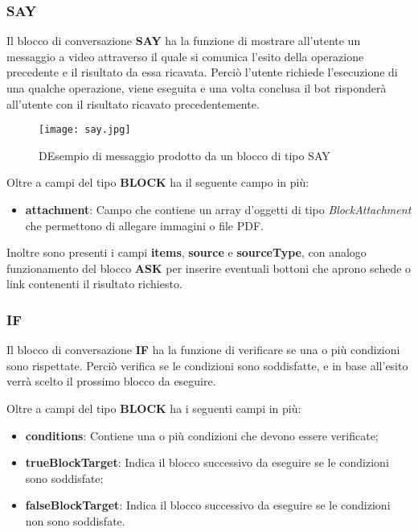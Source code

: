 \subsubsection{SAY}

Il blocco di conversazione \textbf{SAY} ha la funzione di mostrare all'utente un messaggio a video attraverso il quale si comunica l'esito della operazione precedente e il risultato da essa ricavata. Perciò l'utente richiede l'esecuzione di una qualche operazione, viene eseguita e una volta conclusa il bot risponderà all'utente con il risultato ricavato precedentemente.

\begin{figure}[htbp]
	\centering
	\texttt{[image: say.jpg]}
	\caption{DEsempio di messaggio prodotto da un blocco di tipo SAY}
\end{figure}
Oltre a campi del tipo \textbf{BLOCK} ha il seguente campo in più:

\begin{itemize}
	\item \textbf{attachment}: Campo che contiene un array d'oggetti di tipo \textsl{BlockAttachment} che permettono di allegare immagini o file PDF.
\end{itemize}

Inoltre sono presenti i campi \textbf{items}, \textbf{source} e \textbf{sourceType}, con analogo funzionamento del blocco \textbf{ASK} per inserire eventuali bottoni che aprono schede o link contenenti il risultato richiesto.

\subsubsection{IF}

Il blocco di conversazione \textbf{IF} ha la funzione di verificare se una o più condizioni sono rispettate. Perciò verifica se le condizioni sono soddisfatte, e in base all'esito verrà scelto il prossimo blocco da eseguire.

Oltre a campi del tipo \textbf{BLOCK} ha i seguenti campi in più:

\begin{itemize}
	\item \textbf{conditions}: Contiene una o più condizioni che devono essere verificate;
	\item \textbf{trueBlockTarget}: Indica il blocco successivo da eseguire se le condizioni sono soddisfate;
	\item \textbf{falseBlockTarget}: Indica il blocco successivo da eseguire se le condizioni non sono soddisfate.
\end{itemize}


